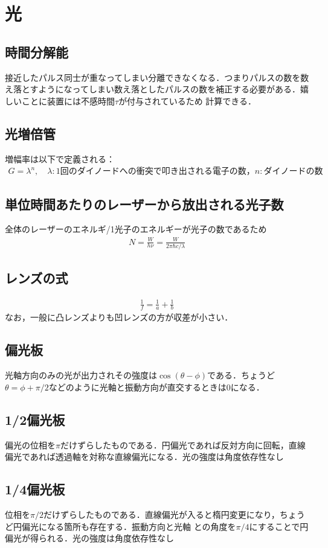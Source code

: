 \documentclass[12pt,dvipdfmx]{jsarticle}
\begin{document}
\section*{\Large{光}}
\subsection*{時間分解能}
接近したパルス同士が重なってしまい分離できなくなる．つまりパルスの数を数え落とすようになってしまい数え落としたパルスの数を補正する必要がある．嬉しいことに装置には不感時間$\tau$が付与されているため
計算できる．
\subsection*{光増倍管}
増幅率は以下で定義される：
\begin{eqnarray}
  G = \lambda^n,\quad \lambda:1回のダイノードへの衝突で叩き出される電子の数，n:ダイノードの数
\end{eqnarray}
\subsection*{単位時間あたりのレーザーから放出される光子数}
全体のレーザーのエネルギ/1光子のエネルギーが光子の数であるため
\begin{eqnarray}
  N = \frac{W}{h\nu} = \frac{W}{2\pi\hbar c/\lambda}
\end{eqnarray}
\subsection*{レンズの式}
\begin{eqnarray}
  \frac{1}{f}= \frac{1}{a} + \frac{1}{b}
\end{eqnarray}
なお，一般に凸レンズよりも凹レンズの方が収差が小さい．
\subsection*{偏光板}
光軸方向のみの光が出力されその強度は$\cos(\theta-\phi)$である．ちょうど$\theta=\phi+\pi/2$などのように光軸と振動方向が直交するときは$0$になる．

\subsection*{1/2偏光板}
偏光の位相を$\pi$だけずらしたものである．円偏光であれば反対方向に回転，直線偏光であれば透過軸を対称な直線偏光になる．光の強度は角度依存性なし
\subsection*{1/4偏光板}
位相を$\pi/2$だけずらしたものである．直線偏光が入ると楕円変更になり，ちょうど円偏光になる箇所も存在する．振動方向と光軸
との角度を$\pi/4$にすることで円偏光が得られる．光の強度は角度依存性なし
\end{document}
